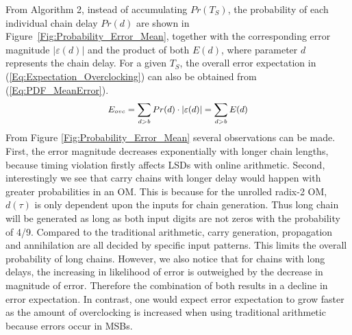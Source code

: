 \documentclass{acm_proc_article-sp}
\begin{document}
\vspace{-2ex}
From Algorithm 2, instead of accumulating $Pr(T_S)$, the probability of each individual chain delay $Pr(d)$ are shown in Figure~\ref{Fig:Probability_Error_Mean}, together with the corresponding error magnitude $|\varepsilon(d)|$ and the product of both $E(d)$, where parameter $d$ represents the chain delay. For a given $T_S$, the overall error expectation in (\ref{Eq:Expectation_Overclocking}) can also be obtained from (\ref{Eq:PDF_MeanError}).
%
%
\begin{eqnarray}\label{Eq:PDF_MeanError}
\scriptsize
  E_{ovc}=\sum_{d>b}Pr(d)\cdot|\varepsilon(d)|=\sum_{d>b}E(d)
\normalsize
\end{eqnarray}
%
From Figure \ref{Fig:Probability_Error_Mean} several observations can be made. First, the error magnitude decreases exponentially with longer chain lengths, because timing violation firstly affects LSDs with online arithmetic. Second, interestingly we see that carry chains with longer delay would happen with greater probabilities in an OM. This is because for the unrolled radix-2 OM, $d(\tau)$ is only dependent upon the inputs for chain generation. Thus long chain will be generated as long as both input digits are not zeros with the probability of 4/9. Compared to the traditional arithmetic, carry generation, propagation and annihilation are all decided by specific input patterns. This limits the overall probability of long chains. However, we also notice that for chains with long delays, the increasing in likelihood of error is outweighed by the decrease in magnitude of error. Therefore the combination of both results in a decline in error expectation. In contrast, one would expect error expectation to grow faster as the amount of overclocking is increased when using traditional arithmetic because errors occur in MSBs.

\end{document}
